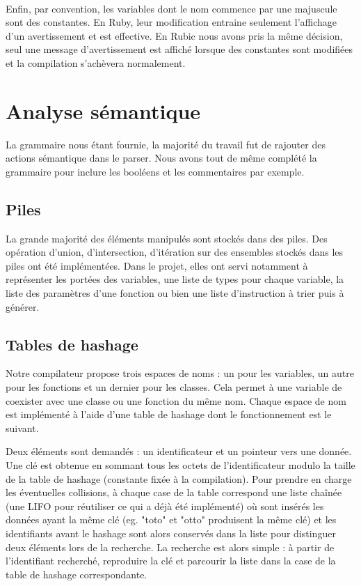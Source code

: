 \documentclass[12pt]{article}
\begin{document}
\paragraph{}
Enfin, par convention, les variables dont le nom commence par une majuscule sont des constantes. En Ruby, leur modification entraine seulement l'affichage d'un avertissement et est effective. En Rubic nous avons pris la même décision, seul une message d'avertissement est affiché lorsque des constantes sont modifiées et la compilation s'achèvera normalement.


\section{Analyse sémantique}

La grammaire nous étant fournie, la majorité du travail fut de rajouter des
actions sémantique dans le parser. Nous avons tout de même complété la
grammaire pour inclure les booléens et les commentaires par exemple.

\subsection{Piles}

La grande majorité des éléments manipulés sont stockés dans des piles. Des opération d'union, d'intersection, d'itération sur des ensembles stockés dans les piles ont été implémentées. Dans le projet, elles ont servi notamment à représenter les portées des variables, une liste de types pour chaque variable, la liste des paramètres d'une fonction ou bien une liste d'instruction à trier puis à générer.


\subsection{Tables de hashage}

Notre compilateur propose trois espaces de noms : un pour les
variables, un autre pour les fonctions et un dernier pour les classes. Cela
permet à une variable de coexister avec une classe ou une fonction du même
nom. Chaque espace de nom est implémenté à l'aide d'une table de hashage dont
le fonctionnement est le suivant.

Deux éléments sont demandés : un identificateur et un pointeur vers une donnée.
Une clé est obtenue en sommant tous les octets de l'identificateur modulo la
taille de la table de hashage (constante fixée à la compilation). Pour prendre
en charge les éventuelles collisions, à chaque case de la table correspond une
liste chaînée (une LIFO pour réutiliser ce qui a déjà été implémenté) où sont
insérés les données ayant la même clé (eg. "toto" et "otto" produisent la même
clé) et les identifiants avant le hashage sont alors conservés dans la liste
pour distinguer deux éléments lors de la recherche. La recherche est alors
simple : à partir de l'identifiant recherché, reproduire la clé et parcourir
la liste dans la case de la table de hashage correspondante.
\end{document}
